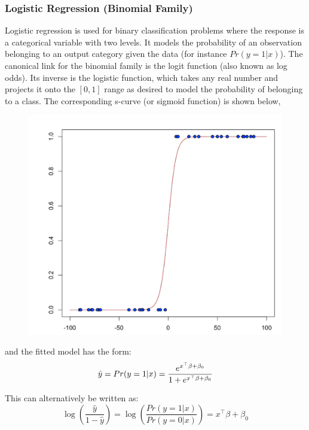 \subsubsection{Logistic Regression (Binomial Family)}
Logistic regression is used for binary classification problems where the response is a categorical variable with two
levels. It models the probability of an observation belonging to an output category given the data (for instance $ Pr(y = 1|x)$).
The canonical link for the binomial family is the logit function (also known as log odds). Its inverse is the logistic function, which takes any real number and projects it onto the $[0,1]$ range as desired to model the probability of belonging to a class. The corresponding s-curve (or sigmoid function) is shown below,

\begin{figure}[h]
\centering
\includegraphics[scale=0.5]{images/scurve.png}
\end{figure}

and the fitted model has the form:
$$ \hat{y} = Pr(y = 1|x) = {e^{x^{\top}\beta + \beta_0} \over 1 + e^{x^{\top} \beta + \beta_0} }$$

This can alternatively be written as: 
$$  \log \left( \frac{\hat{y}}{ 1- \hat{y} } \right)  = \log \left(  \frac{Pr(y=1|x)}{Pr(y=0|x)}   \right) = x^{\top} \beta + \beta_0$$

